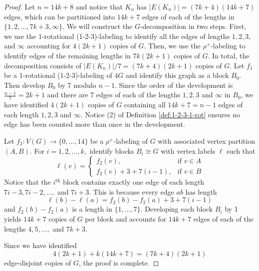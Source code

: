 \documentclass{dmgt}
\begin{document}
\begin{proof}
    Let $n=14k+8$ and notice that $K_n$ has $|E(K_n)|=(7k+4)(14k+7)$ edges, which can be partitioned into $14k+7$ edges of each of the lengths in $\{1,2,\dots,7k+3,\infty\}.$  We will construct the $G$-decomposition in two steps. First, we use the 1-rotational (1-2-3)-labeling to identify all the edges of lengths $1,2,3,$ and $\infty$ accounting for $4(2k+1)$ copies of $G$. Then, we use the $\rho^{+}$-labeling to identify edges of the remaining lengths in $7k(2k+1)$ copies of $G$. In total, the decomposition consists of $|E(K_n)|/7=(7k+4)(2k+1)$ copies of $G.$
    Let $f_1$ be a 1-rotational (1-2-3)-labeling of $4G$ and identify this graph as a block $B_0$. Then develop $B_0$ by 7 modulo $n-1$. Since the order of the development is $\frac{n-1}{7}=2k+1$ and there are 7 edges of each of the lengths $1,2,3$ and $\infty$ in $B_0$, we have identified $4(2k+1)$ copies of $G$ containing all $14k+7=n-1$ edges of each length $1,2,3$ and $\infty$. Notice (2) of Definition \ref{def:1-2-3-1-rot} ensures no edge has been counted more than once in the development.

    Let $f_2:V(G) \rightarrow \{0,\dots,14\}$ be a $\rho^{+}$-labeling of $G$ with associated vertex partition $(A,B).$ For $i=1,2,\dots,k,$ identify blocks $B_i \cong G$ with vertex labels $\ell$ such that
    \[
    \ell(v)=
    \begin{cases}
        f_2(v), & \textrm{if } v \in A \\
        f_2(v)+3+7(i-1), & \textrm{if } v \in B
    \end{cases}
    \]
    Notice that the $i^{\textrm{th}}$ block contains exactly one edge of each length $7i-3,7i-2, \dots,$ and $ 7i+3.$ This is because every edge $ab$ has length 
    \[
    \ell(b)-\ell(a)=f_2(b)-f_2(a)+3+7(i-1)
    \]
    and $f_2(b)-f_2(a)$ is a length in $\{1,\dots,7\}.$
    Developing each block $B_i$ by 1 yields $14k+7$ copies of $G$ per block and accounts for $14k+7$ edges of each of the lengths $4,5,\dots,$ and $7k+3$.

    Since we have identified
    \[
    4(2k+1)+k(14k+7)=(7k+4)(2k+1)
    \]
    edge-disjoint copies of $G$, the proof is complete.
\end{proof}
\end{document}
